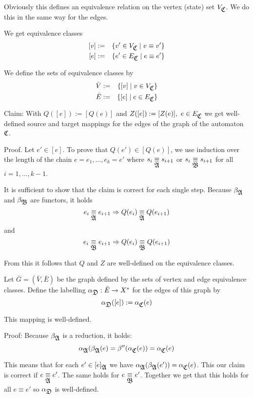 Obviously this defines an equivalence relation on the vertex (state) set
$V_{\mbox{$\mathfrak{C}$}}$. We do this in the same way for the edges.

We get equivalence classes
\begin{eqnarray*}
\left[ v \right] & := & \{ v' \in V_{\mbox{$\mathfrak{C}$}} \mid v \equiv v' \} \\
\left[ e \right] & := & \{ e' \in E_{\mbox{$\mathfrak{C}$}} \mid e \equiv e' \}
\end{eqnarray*}

We define the sets of equivalence classes by
\begin{eqnarray*}
\bar{V} & := & \{ [v] \mid v \in V_{\mbox{$\mathfrak{C}$}} \} \\ 
\bar{E} & := & \{ [e] \mid e \in E_{\mbox{$\mathfrak{C}$}} \} 
\end{eqnarray*}

Claim: With $Q([e]) := [Q(e)]$ and $Z([e]) := [Z(e)],\ e \in E_{\mbox{$\mathfrak{C}$}}$ we get
well-defined source and target mappings for the edges of the graph of
the automaton $\mbox{$\mathfrak{C}$}$.

Proof. Let $e' \in [e]$. To prove that $Q(e') \in [Q(e)]$, we use induction over
the length of the chain $e = e_1, \ldots, e_k = e'$ where $s_i \underset{\mbox{$\mathfrak{A}$}}{\equiv}
s_{i+1}$ or $s_i \underset{\mbox{$\mathfrak{B}$}}{\equiv} s_{i+1}$ for all $i = 1,\ldots,k-1$. 

It is sufficient to show that the claim is correct for each single step. Because
$\beta_{\mbox{$\mathfrak{A}$}}$ and $\beta_{\mbox{$\mathfrak{B}$}}$ are functors, it holds
\[ e_i \underset{\mbox{$\mathfrak{A}$}}{\equiv} e_{i+1} \Rightarrow Q(e_i) \underset{\mbox{$\mathfrak{A}$}}{\equiv} Q(e_{i+1}) \]
and
\[ e_i \underset{\mbox{$\mathfrak{B}$}}{\equiv} e_{i+1} \Rightarrow Q(e_i) \underset{\mbox{$\mathfrak{B}$}}{\equiv} Q(e_{i+1}) \]

From this it follows that $Q$ and $Z$ are well-defined on the equivalence
classes.

Let $\bar{G} = (\bar{V}, \bar{E})$ be the graph defined by the sets of vertex
and edge equivalence classes. Define the labelling $\alpha_{\mbox{$\mathfrak{D}$}} : \bar{E}
\to X^*$ for the edges of this graph by
\[ \alpha_{\mbox{$\mathfrak{D}$}}([e]) := \alpha_{\mbox{$\mathfrak{C}$}}(e) \]

This mapping is well-defined. 

Proof: Because $\beta_{\mbox{$\mathfrak{A}$}}$ is a reduction, it holds:
\[ \alpha_{\mbox{$\mathfrak{A}$}}(\beta_{\mbox{$\mathfrak{A}$}}(e) = \beta''(\alpha_{\mbox{$\mathfrak{C}$}}(e)) =
\alpha_{\mbox{$\mathfrak{C}$}}(e) \]

This means that for each $e' \in [e]_{\mbox{$\mathfrak{A}$}}$ we have
$\alpha_{\mbox{$\mathfrak{A}$}}(\beta_{\mbox{$\mathfrak{A}$}}(e')) = \alpha_{\mbox{$\mathfrak{C}$}}(e)$. This our claim is
correct if $e \underset{\mbox{$\mathfrak{A}$}}{\equiv} e'$. The same holds for $e \underset{\mbox{$\mathfrak{B}$}}{\equiv} e'$. Together
we get that this holds for all $e \equiv e'$ so $\alpha_{\mbox{$\mathfrak{D}$}}$ is
well-defined.


